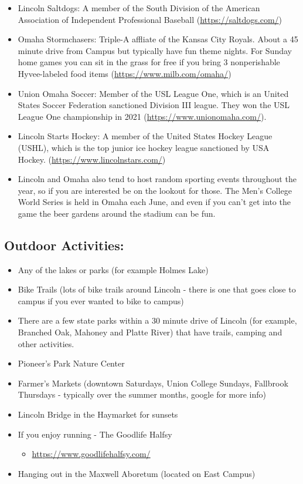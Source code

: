 \documentclass[
  12pt,
]{book}
\providecommand{\tightlist}{%
  \setlength{\itemsep}{0pt}\setlength{\parskip}{0pt}}
\begin{document}
\begin{itemize}
  \begin{itemize}
  \tightlist
  \item
    Lincoln Saltdogs: A member of the South Division of the American Association of Independent Professional Baseball (\url{https://saltdogs.com/})
  \item
    Omaha Stormchasers: Triple-A affliate of the Kansas City Royals. About a 45 minute drive from Campus but typically have fun theme nights. For Sunday home games you can sit in the grass for free if you bring 3 nonperishable Hyvee-labeled food items (\url{https://www.milb.com/omaha/})
  \item
    Union Omaha Soccer: Member of the USL League One, which is an United States Soccer Federation sanctioned Division III league. They won the USL League One championship in 2021 (\url{https://www.unionomaha.com/}).
  \item
    Lincoln Starts Hockey: A member of the United States Hockey League (USHL), which is the top junior ice hockey league sanctioned by USA Hockey. (\url{https://www.lincolnstars.com/})
  \item
    Lincoln and Omaha also tend to host random sporting events throughout the year, so if you are interested be on the lookout for those. The Men's College World Series is held in Omaha each June, and even if you can't get into the game the beer gardens around the stadium can be fun.
  \end{itemize}
\end{itemize}

\hypertarget{outdoor-activities}{%
\subsection{Outdoor Activities:}\label{outdoor-activities}}

\begin{itemize}
\tightlist
\item
  Any of the lakes or parks (for example Holmes Lake)
\item
  Bike Trails (lots of bike trails around Lincoln - there is one that goes close to campus if you ever wanted to bike to campus)
\item
  There are a few state parks within a 30 minute drive of Lincoln (for example, Branched Oak, Mahoney and Platte River) that have trails, camping and other activities.
\item
  Pioneer's Park Nature Center
\item
  Farmer's Markets (downtown Saturdays, Union College Sundays, Fallbrook Thursdays - typically over the summer months, google for more info)
\item
  Lincoln Bridge in the Haymarket for sunsets
\item
  If you enjoy running - The Goodlife Halfsy

  \begin{itemize}
  \tightlist
  \item
    \url{https://www.goodlifehalfsy.com/}
  \end{itemize}
\item
  Hanging out in the Maxwell Aboretum (located on East Campus)
\end{itemize}
\end{document}
